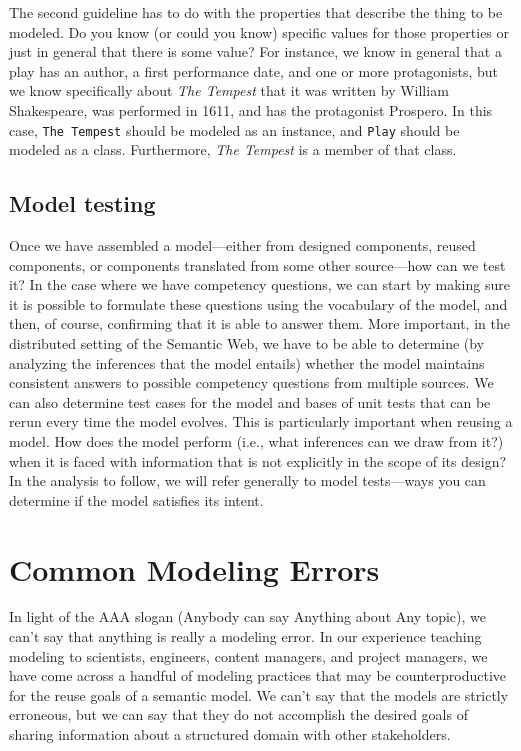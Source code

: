 The second guideline has to do with the properties that describe the
thing to be modeled. Do you know (or could you know) specific values for
those properties or just in general that there is some value? For
instance, we know in general that a play has an author, a first
performance date, and one or more protagonists, but we know specifically
about \emph{The Tempest} that it was written by William Shakespeare, was
performed in 1611, and has the protagonist Prospero. In this case, \texttt{The
Tempest} should be modeled as an instance, and \texttt{Play} should be modeled as
a class. Furthermore, \emph{The Tempest} is a member of that class.

\subsection{Model testing}

Once we have assembled a model---either from designed components, reused
components, or components translated from some other source---how can we
test it? In the case where we have competency questions, we can start by
making sure it is possible to formulate these questions using the vocabulary of the model, 
and then, of course, confirming that it is able to answer them. 
More important, in the distributed setting
of the Semantic Web, we have to be able to determine (by analyzing the inferences that
the model entails) whether the model maintains consistent answers to possible
competency questions from multiple sources. We can also determine test
cases for the model and bases of unit tests that can be rerun every time the model evolves. 
This is particularly important when reusing a
model. How does the model perform (i.e., what inferences can we draw
from it?) when it is faced with information that is not explicitly in
the scope of its design? In the analysis to follow, we will refer
generally to model tests---ways you can determine if the model satisfies
its intent.

\section{Common Modeling Errors}

In light of the AAA slogan (Anybody can say Anything about Any topic),
we can't say that anything is really a modeling error. In our experience
teaching modeling to scientists, engineers, content managers, and
project managers, we have come across a handful of modeling practices
that may be counterproductive for the reuse goals of a semantic model.
We can't say that the models are strictly erroneous, but we can say that
they do not accomplish the desired goals of sharing information about a
structured domain with other stakeholders.

